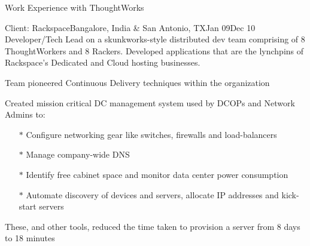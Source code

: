 \documentclass{resume} %
\begin{document}
\begin{rSection}{Work Experience with ThoughtWorks}

\begin{rSubsection}{Client: Rackspace}{Bangalore, India \& San Antonio,
  TX}{Jan 09}{Dec
    10}
{Developer/Tech Lead on a skunkworks-style distributed dev team comprising of 8
  ThoughtWorkers and 8 Rackers. Developed applications that are the
  lynchpins of Rackspace's Dedicated and Cloud hosting businesses.}

\item Team pioneered Continuous Delivery techniques within the organization
\item Created mission critical DC management system used by
  DCOPs and Network Admins to:
\vspace{-0.5em}
\begin{itemize}  \itemsep0.5pt \parskip0pt
    \item[$\ast$] Configure networking gear like switches, firewalls and load-balancers
    \item[$\ast$] Manage company-wide DNS
    \item[$\ast$] Identify free cabinet space and monitor data center power consumption
    \item[$\ast$] Automate discovery of devices and servers, allocate IP addresses and kick-start servers
\end{itemize}
\item These, and other tools, reduced the time taken to provision a server from 8 days to 18 minutes
\end{rSubsection}

\end{rSection}

\end{document}
